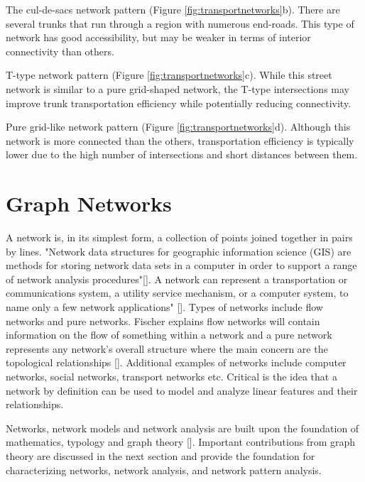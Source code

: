 The cul-de-sacs network pattern (Figure \ref{fig:transportnetworks}b). There are several trunks that run through a region with numerous end-roads. This type of network has good accessibility, but may be weaker in terms of interior connectivity than others.

T-type network pattern (Figure \ref{fig:transportnetworks}c). While this street network is similar to a pure grid-shaped network, the T-type intersections may improve trunk transportation efficiency while potentially reducing connectivity.

Pure grid-like network pattern (Figure \ref{fig:transportnetworks}d). Although this network is more connected than the others, transportation efficiency is typically lower due to the high number of intersections and short distances between them.

\section{Graph Networks}
A network is, in its simplest form, a collection of points joined together in pairs by lines. \cite{Newman:2010} "Network data structures for geographic information science (GIS) are methods for storing network data sets in a computer in order to support a range of network analysis procedures"[\cite{Curtin:2008}]. A network can represent a transportation or communications system, a utility service mechanism, or a computer system, to name only a few network applications" [\cite{Curtin:2008}]. Types of networks include flow networks and pure networks. Fischer explains flow networks will contain information on the flow of something within a network and a pure network represents any network's overall structure where the main concern are the topological relationships [\cite{Ficsher:2003}]. Additional examples of networks include computer networks, social networks, transport networks etc. Critical is the idea that a network by definition can be used to model and analyze linear features and their relationships. 

Networks, network models and network analysis are built upon the foundation of mathematics, typology and graph theory [\cite{Sovik:2014}]. Important contributions from graph theory are discussed in the next section and provide the foundation for characterizing networks, network analysis, and network pattern analysis.

